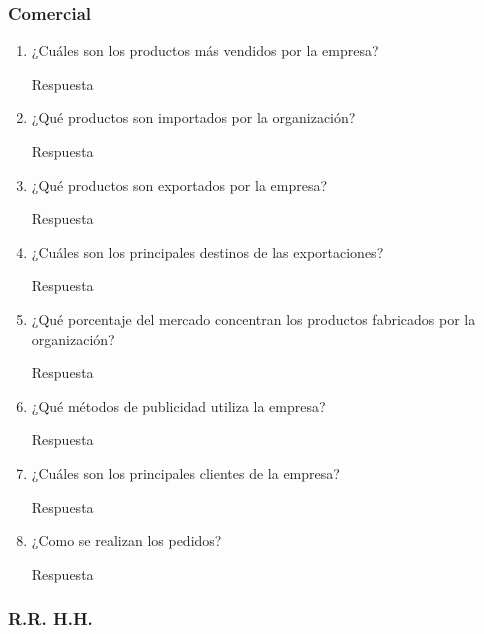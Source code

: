 \documentclass[a4paper,10pt]{article}
\begin{document}
		\subsubsection{Comercial}
		
		
			\begin{enumerate}[resume]
			
				\item ¿Cuáles son los productos más vendidos por la empresa?
			
				Respuesta
				
				\item ¿Qué productos son importados por la organización?
				
				Respuesta
				
				\item ¿Qué productos son exportados por la empresa?
				
				Respuesta
				
				\item ¿Cuáles son los principales destinos de las exportaciones?
				
				Respuesta
				
				\item ¿Qué porcentaje del mercado concentran los productos fabricados por la organización?
				
				Respuesta
				
				\item ¿Qué métodos de publicidad utiliza la empresa?
				
				Respuesta
				
				\item ¿Cuáles son los principales clientes de la empresa?
				
				Respuesta
				
				\item ¿Como se realizan los pedidos?
				
				Respuesta
				
			\end{enumerate}
		\subsubsection{R.R. H.H.}
		
\end{document}
